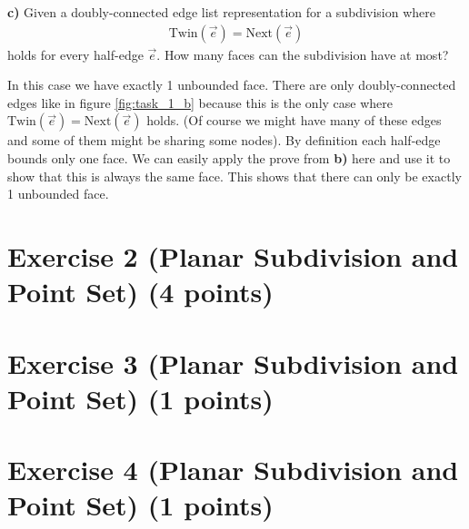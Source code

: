 \documentclass[english, fontsize=12pt, paper=a4, twoside=false, draft=true, pagesize=auto, version=last, DIV=16]{scrartcl}
\theoremstyle{break}
\begin{document}
\textbf{c)} Given a doubly-connected edge list representation for a subdivision where
\begin{align*}
\text{Twin}(\vec{e}) = \text{Next}(\vec{e})
\end{align*} 
holds for every half-edge $\vec{e}$. How many faces can the subdivision have at most? \par
\medskip
In this case we have exactly 1 unbounded face. There are only doubly-connected edges like in figure \ref{fig:task_1_b} because this is the only case where $\text{Twin}(\vec{e}) = \text{Next}(\vec{e})$ holds. (Of course we might have many of these edges and some of them might be sharing some nodes). By definition each half-edge bounds only one face. We can easily apply the prove from \textbf{b)} here and use it to show that this is always the same face. This shows that there can only be exactly 1 unbounded face.

\vspace*{10mm}
\newpage




\section*{Exercise 2 (Planar Subdivision and Point Set) {\large \hfill (4 points)}}

\section*{Exercise 3 (Planar Subdivision and Point Set) {\large \hfill (1 points)}}

\section*{Exercise 4 (Planar Subdivision and Point Set) {\large \hfill (1 points)}}

\newpage
\end{document}
